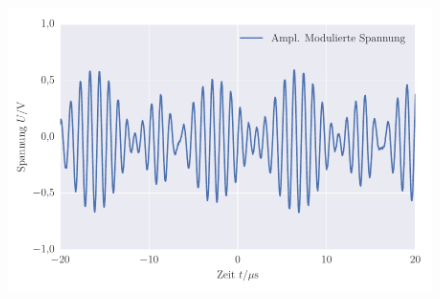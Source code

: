 
\FloatBarrier\begin{figure}[!h]
\centering
\includegraphics[scale=1]{../Grafiken/Frequenz_Moduliert_Demodulation_Amplitude.pdf}
\caption{\label{fig:frequenz_moduliert_demodulation_amplitude}}
\end{figure}
\FloatBarrier